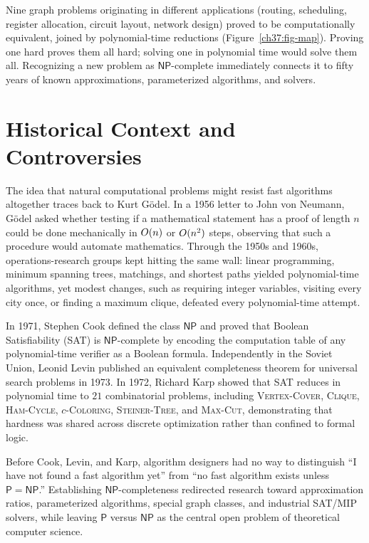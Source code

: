 \begin{aestheticbox}
Nine graph problems originating in different applications (routing, scheduling, register
allocation, circuit layout, network design) proved to be computationally equivalent,
joined by polynomial-time reductions (Figure~\ref{ch37:fig-map}). Proving one hard proves them all hard; solving one
in polynomial time would solve them all. Recognizing a new problem as $\mathsf{NP}$-complete immediately connects it to fifty years of known approximations, parameterized algorithms, and solvers.
\end{aestheticbox}

\section{Historical Context and Controversies}
\label{ch37:history}

\begin{historybox}
The idea that natural computational problems might resist fast algorithms altogether traces back to Kurt G\"odel. In a 1956 letter to John von Neumann, G\"odel asked whether testing if a mathematical statement has a proof of length $n$ could be done mechanically in $O(n)$ or $O(n^2)$ steps, observing that such a procedure would automate mathematics. Through the 1950s and 1960s, operations-research groups kept hitting the same wall: linear programming, minimum spanning trees, matchings, and shortest paths yielded polynomial-time algorithms, yet modest changes, such as requiring integer variables, visiting every city once, or finding a maximum clique, defeated every polynomial-time attempt.

In 1971, Stephen Cook defined the class $\mathsf{NP}$ and proved that Boolean Satisfiability (\textsc{SAT}) is $\mathsf{NP}$-complete by encoding the computation table of any polynomial-time verifier as a Boolean formula. Independently in the Soviet Union, Leonid Levin published an equivalent completeness theorem for universal search problems in 1973. In 1972, Richard Karp showed that \textsc{SAT} reduces in polynomial time to $21$ combinatorial problems, including \textsc{Vertex-Cover}, \textsc{Clique}, \textsc{Ham-Cycle}, $c$-\textsc{Coloring}, \textsc{Steiner-Tree}, and \textsc{Max-Cut}, demonstrating that hardness was shared across discrete optimization rather than confined to formal logic.

Before Cook, Levin, and Karp, algorithm designers had no way to distinguish ``I have not found a fast algorithm yet'' from ``no fast algorithm exists unless $\mathsf{P}=\mathsf{NP}$.'' Establishing $\mathsf{NP}$-completeness redirected research toward approximation ratios, parameterized algorithms, special graph classes, and industrial SAT/MIP solvers, while leaving $\mathsf{P}$ versus $\mathsf{NP}$ as the central open problem of theoretical computer science.
\end{historybox}

